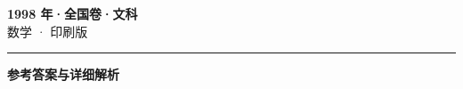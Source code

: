 \documentclass[zihao=5, a4paper]{ctexart}
\begin{document}
\begin{center}
  {\Large\bfseries 1998 年·全国卷·文科}\\[4pt]
  {\large 数学 · 印刷版}
\end{center}
\medskip
{}

\par\bigskip\hrule\bigskip
{}
\begin{center}{\large\bfseries 参考答案与详细解析}\end{center}
\smallskip

\end{document}
